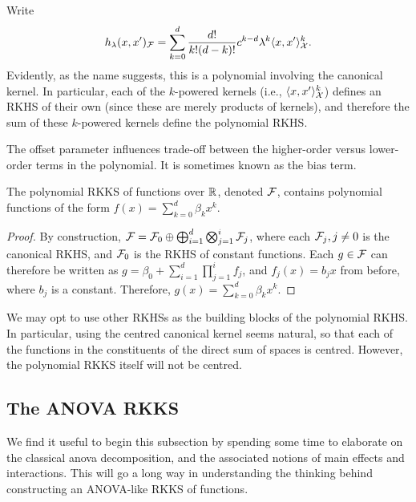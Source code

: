 Write
\begin{align*}
  h_\lambda(x,x')_{\mathcal F} = \sum_{k=0}^d \frac{d!}{k!(d-k)!} c^{k-d} \lambda^k \langle x,x'\rangle_{\mathcal X}^k.
\end{align*}
Evidently, as the name suggests, this is a polynomial involving the canonical kernel.
In particular, each of the $k$-powered kernels (i.e., $\langle x,x'\rangle_{\mathcal X}^k$) defines an RKHS of their own (since these are merely products of kernels), and therefore the sum of these $k$-powered kernels define the polynomial RKHS.

The offset parameter influences trade-off between the higher-order versus lower-order terms in the polynomial.
It is sometimes known as the bias term.

\begin{claim}
  The polynomial RKKS of functions over $\mathbb{R}$, denoted ${\mathcal F}$, contains polynomial functions of the form $f(x)=\sum_{k=0}^d \beta_k x^k$.
\end{claim}

\begin{proof}
  By construction, ${\mathcal F} = {\mathcal F}_0 \oplus \bigoplus_{i=1}^d\bigotimes_{j=1}^i {\mathcal F}_j$, where each ${\mathcal F}_j, j \neq 0$ is the canonical RKHS, and ${\mathcal F}_0$ is the RKHS of constant functions.
  Each $g \in {\mathcal F}$ can therefore be written as $g = \beta_0 + \sum_{i=1}^d\prod_{j=1}^i f_j$, and $f_j(x)= b_j x$ from before, where $b_j$ is a constant.
  Therefore, $g(x) = \sum_{k=0}^d \beta_k x^k$.
\end{proof}

\begin{remark}
  We may opt to use other RKHSs as the building blocks of the polynomial RKHS.
  In particular, using the centred canonical kernel seems natural, so that each of the functions in the constituents of the direct sum of spaces is centred.
  However, the polynomial RKKS itself will not be centred.
\end{remark}


\subsection{The ANOVA RKKS}

We find it useful to begin this subsection by spending some time to elaborate on the classical \gls*{anova} decomposition, and the associated notions of main effects and interactions.
This will go a long way in understanding the thinking behind constructing an ANOVA-like RKKS of functions.

